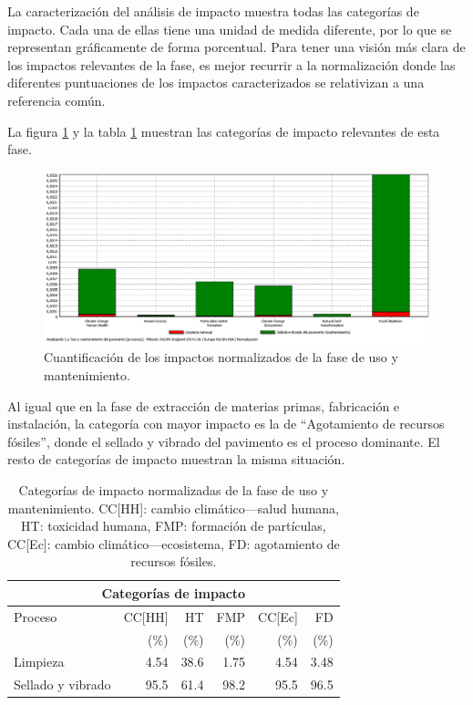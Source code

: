 La caracterización del análisis de impacto muestra todas las categorías de impacto. Cada una de ellas tiene una unidad de medida diferente, por lo que se representan gráficamente de forma porcentual. Para tener una visión más clara de los impactos relevantes de la fase, es mejor recurrir a la normalización donde las diferentes puntuaciones de los impactos caracterizados se relativizan a una referencia común.

La figura \ref{fig:uso_normalizacion} y la tabla \ref{categoriasimpactouso} muestran las categorías de impacto relevantes de esta fase.

\begin{figure}[!htb]
\centering
\includegraphics[width=15cm]{img/uso_normalizacion.png}
\caption{Cuantificación de los impactos normalizados de la fase de uso y mantenimiento.}
\label{fig:uso_normalizacion}
\end{figure}

Al igual que en la fase de extracción de materias primas, fabricación e instalación, la categoría con mayor impacto es la de ``Agotamiento de recursos fósiles'', donde el sellado y vibrado del pavimento es el proceso dominante. El resto de categorías de impacto muestran la misma situación.

\begin{table}[!htb]
\centering
\begin{tabular}{p{4cm}rrrrr}
\toprule
\multicolumn{6}{c}{Categorías de impacto}\\
\midrule
Proceso & CC[HH] & HT & FMP & CC[Ec] & FD\\
 &  (\%) & (\%) & (\%) & (\%) & (\%)\\
\midrule
Limpieza & 4.54 & 38.6 & 1.75 & 4.54 & 3.48\\
Sellado y vibrado & 95.5 & 61.4 & 98.2 & 95.5 & 96.5\\
\bottomrule
\end{tabular}
\caption[Categorías de impacto normalizadas de la fase de uso y mantenimiento.]{Categorías de impacto normalizadas de la fase de uso y mantenimiento. CC[HH]: cambio climático—salud humana, HT: toxicidad humana, FMP: formación de partículas, CC[Ec]: cambio climático—ecosistema, FD: agotamiento de recursos fósiles.}
\label{categoriasimpactouso}
\end{table}

